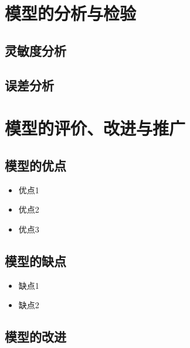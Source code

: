 \documentclass[withoutpreface,bwprint]{cumcmthesis}
\begin{document}
\newpage
\section{模型的分析与检验}

\subsection{灵敏度分析}

\subsection{误差分析}















\newpage
\section{模型的评价、改进与推广}

\subsection{模型的优点}
\begin{itemize}[itemindent=2em]
\item 优点1
\item 优点2
\item 优点3
\end{itemize}

\subsection{模型的缺点}
\begin{itemize}[itemindent=2em]
\item 缺点1
\item 缺点2
\end{itemize}




\subsection{模型的改进}
\end{document}
